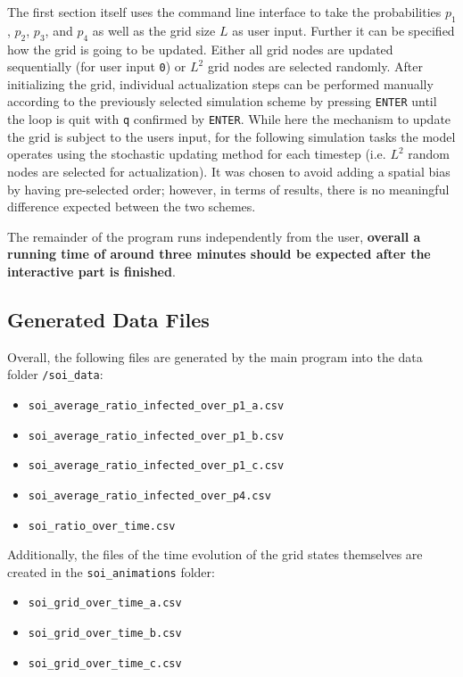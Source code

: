 The first section itself uses the command line interface to take the probabilities $p_1$, $p_2$, $p_3$, and $p_4$ as well as the grid size $L$ as user input. Further it can be specified how the grid is going to be 
updated. Either all grid nodes are updated sequentially (for user input \texttt{0}) or $L^2$ grid nodes are selected randomly. After initializing the grid, 
individual actualization steps can be performed manually according to the previously selected simulation scheme by pressing \texttt{ENTER} until the loop is quit with \texttt{q} confirmed by \texttt{ENTER}.
While here the mechanism to update the grid is subject to the users input, for the following simulation tasks the model operates using the stochastic updating method for each timestep 
(i.e. $L^2$ random nodes are selected for actualization). It was chosen to avoid adding a spatial bias by having pre-selected order; however,
in terms of results, there is no meaningful difference expected between the two schemes.

The remainder of the program runs independently from the user, \textbf{overall a running time of around three minutes should be expected after the interactive part is finished}.


\subsection{Generated Data Files}

Overall, the following files are generated by the main program into the data folder \texttt{/soi\_data}:
\begin{itemize}
    \item \texttt{soi\_average\_ratio\_infected\_over\_p1\_a.csv}
    \item \texttt{soi\_average\_ratio\_infected\_over\_p1\_b.csv}
    \item \texttt{soi\_average\_ratio\_infected\_over\_p1\_c.csv}
    \item \texttt{soi\_average\_ratio\_infected\_over\_p4.csv}
    \item \texttt{soi\_ratio\_over\_time.csv}
\end{itemize}

Additionally, the files of the time evolution of the grid states themselves are created in the \texttt{soi\_animations} folder:
\begin{itemize}
    \item \texttt{soi\_grid\_over\_time\_a.csv}
    \item \texttt{soi\_grid\_over\_time\_b.csv}
    \item \texttt{soi\_grid\_over\_time\_c.csv}
\end{itemize}
